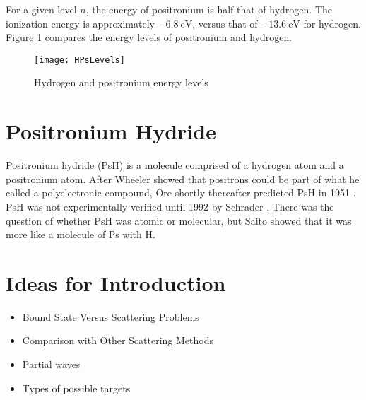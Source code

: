 \documentclass[Introduction.tex]{subfiles}
\begin{document}
For a given level $n$, the energy of positronium is half that of hydrogen. The ionization energy is approximately $\SI{-6.8}{\eV}$, versus that of $\SI{-13.6}{\eV}$ for hydrogen. Figure \ref{fig:HPsLevels} compares the energy levels of positronium and hydrogen.
\begin{figure}[H]
	\centering
	\texttt{[image: HPsLevels]}
	\caption{Hydrogen and positronium energy levels}
	\label{fig:HPsLevels}
\end{figure}

\section{Positronium Hydride}
\label{sec:PsH}
Positronium hydride (PsH) is a molecule comprised of a hydrogen atom and a positronium atom. After Wheeler \cite{Wheeler1946} showed that positrons could be part of what he called a polyelectronic compound, Ore shortly thereafter predicted PsH in 1951 \cite{Ore1951}. PsH was not experimentally verified until 1992 by Schrader \cite{Schrader1992}. There was the question of whether PsH was atomic or molecular, but Saito \cite{Saito2000} showed that it was more like a molecule of Ps with H.





\section{Ideas for Introduction}

\begin{itemize}
	\item Bound State Versus Scattering Problems
	\item Comparison with Other Scattering Methods
	\item Partial waves
	\item Types of possible targets
\end{itemize}

\end{document}
